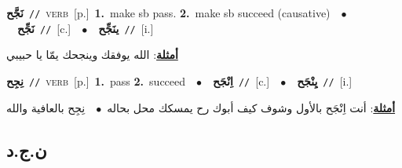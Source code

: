 \documentclass[10pt,a4paper,twoside]{article} %
\begin{document}
\begin{multicols}{2}
{\setlength\topsep{0pt}\textbf{\foreignlanguage{arabic}{نَجَّح}}\ {\color{gray}\texttt{//}\color{black}}\ \textsc{verb}\ [p.]\ \textbf{1.}~make sb pass.  \textbf{2.}~make sb succeed (causative)\ \ $\bullet$\ \ \setlength\topsep{0pt}\textbf{\foreignlanguage{arabic}{نَجِّح}}\ {\color{gray}\texttt{//}\color{black}}\ [c.]\ \ $\bullet$\ \ \setlength\topsep{0pt}\textbf{\foreignlanguage{arabic}{ينَجِّح}}\ {\color{gray}\texttt{//}\color{black}}\ [i.]\  \begin{flushright}\color{gray}\foreignlanguage{arabic}{\textbf{\underline{\foreignlanguage{arabic}{أمثلة}}}: الله يوفقك وينجحك يمّا يا حبيبي}\end{flushright}\color{black}} \vspace{2mm}

{\setlength\topsep{0pt}\textbf{\foreignlanguage{arabic}{نِجِح}}\ {\color{gray}\texttt{//}\color{black}}\ \textsc{verb}\ [p.]\ \textbf{1.}~pass  \textbf{2.}~succeed\ \ $\bullet$\ \ \setlength\topsep{0pt}\textbf{\foreignlanguage{arabic}{اِنْجَح}}\ {\color{gray}\texttt{//}\color{black}}\ [c.]\ \ $\bullet$\ \ \setlength\topsep{0pt}\textbf{\foreignlanguage{arabic}{يِنْجَح}}\ {\color{gray}\texttt{//}\color{black}}\ [i.]\  \begin{flushright}\color{gray}\foreignlanguage{arabic}{\textbf{\underline{\foreignlanguage{arabic}{أمثلة}}}: أنت اِنْجَح بالأول وشوف كيف أبوك رح يمسكك محل بحاله\ $\bullet$\ \  نِجِح بالعافية والله}\end{flushright}\color{black}} \vspace{2mm}

\vspace{-3mm}
\subsection*{\color{blue}\foreignlanguage{arabic}{ن.ج.د}\color{blue}{}} 


\end{multicols}
\end{document}
